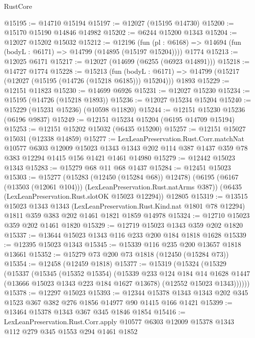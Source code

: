 \begin{lexlean}{RustCore}
\begin{coremodule}
@15195 := @14710 @15194
@15197 := @12027 (@15195 @14730)
@15200 := @15170 @15190 @14846 @14982
@15202 := @6244 @15200 @1343
@15204 := @12027 @15202 @15032
@15212 := @12196
    (fun (pl : @6168) => @14694 (fun (bodyL : @6171) => @14799 (@14895 (@15197 @15204))))
    @1774
@15213 := @12025 @6171
@15217 := @12027 (@14699 (@6255 (@6923 @14891)))
@15218 := @14727 @1774
@15228 := @15213
    (fun (bodyL : @6171) => @14799 (@15217 (@12027 (@15195 (@14726 (@15218 @6185))) @15204)))
    @1893
@15229 := @12151 @11823
@15230 := @14699 @6926
@15231 := @12027 @15230
@15234 := @15195 (@14726 (@15218 @1893))
@15236 := @12027 @15234 @15204
@15240 := @15229 (@15231 @15236) (@10598 @11820)
@15244 := @12151 @15230 @15236 (@6196 @9837)
@15249 := @12151 @15234 @15204 (@6195 @14709 @15194)
@15253 := @12151 @15202 @15032 (@6435 @15200)
@15257 := @12151 @15027 @15031 (@12338 @14859)
@15277 := LexLeanPreservation.Rust.Corr.matchNat
    @10577
    @6303
    @12009
    @15023
    @1343
    @1343
    @202
    @114
    @387
    @1437
    @359
    @78
    @383
    @12294
    @1415
    @156
    @1421
    @1461
    @14980
@15279 := @12442 @15023 @1343
@15283 := @15279 @68 @11 @68 @1437
@15284 := @12451 @15023
@15303 := @15277
    (@15283 (@12450 (@15284 @68)) @12478)
    (@6195 (@6167 (@13503 (@12061 @104))) (LexLeanPreservation.Rust.natArms @387))
    (@6435 (LexLeanPreservation.Rust.slotOK @15023 @12294))
    @12805
@15319 := @13515
    @15023
    @1343
    @1343
    (LexLeanPreservation.Rust.Kind.nat @1801 @78 @12294)
    @1811
    @359
    @383
    @202
    @1461
    @1821
    @1859
    @14978
@15324 := @12710 @15023 @359 @202 @1461 @1820
@15329 := @12719 @15023 @1343 @359 @202 @1820
@15337 := @13644 @15023 @1343 @116 @233 @200 @184 @1818 @1628
@15339 := @12395 @15023 @1343
@15345 := @15339 @116 @235 @200 @13657 @1818 @13661
@15352 := @15279 @73 @200 @73 @1818 (@12450 (@15284 @73))
@15354 := @12458 (@12459 @1818)
@15377 := @15319
    (@15324
      (@15329
        (@15337
          (@15345
            (@15352 @15354)
            (@15339
              @233
              @124
              @184
              @14
              @1628
              @1447
              (@13666 @15023 @1343 @223 @184 @1627 @13678)
              (@12552 @15023 @1343))))))
@15378 := @12297 @15023
@15393 := @12344 @15378 @1343 @1343 @202 @345 @1523 @367 @382 @276 @1856 @14977 @90 @1415 @166 @1421
@15399 := @13464 @15378 @1343 @367 @345 @1846 @1854
@15416 := LexLeanPreservation.Rust.Corr.apply
    @10577
    @6303
    @12009
    @15378
    @1343
    @112
    @279
    @345
    @1553
    @294
    @1461
    @1852

\end{coremodule}
\end{lexlean}
